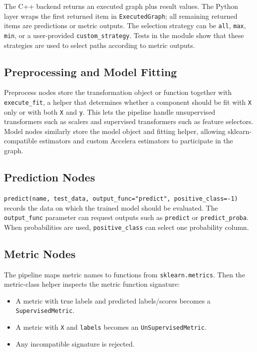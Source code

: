 \documentclass[11pt,a4paper]{article}
\begin{document}
The C++ backend returns an executed graph plus result values. The Python layer
wraps the first returned item in \texttt{ExecutedGraph}; all remaining returned
items are predictions or metric outputs. The selection strategy can be
\texttt{all}, \texttt{max}, \texttt{min}, or a user-provided
\texttt{custom\_strategy}. Tests in the module show that these strategies are
used to select paths according to metric outputs.

\subsection{Preprocessing and Model Fitting}

Preprocess nodes store the transformation object or function together with
\texttt{execute\_fit}, a helper that determines whether a component should be
fit with \texttt{X} only or with both \texttt{X} and \texttt{y}. This lets the
pipeline handle unsupervised transformers such as scalers and supervised
transformers such as feature selectors. Model nodes similarly store the model
object and fitting helper, allowing sklearn-compatible estimators and custom
Accelera estimators to participate in the graph.

\subsection{Prediction Nodes}

\texttt{predict(name, test\_data, output\_func="predict", positive\_class=-1)}
records the data on which the trained model should be evaluated. The
\texttt{output\_func} parameter can request outputs such as \texttt{predict} or
\texttt{predict\_proba}. When probabilities are used, \texttt{positive\_class}
can select one probability column.

\subsection{Metric Nodes}

The pipeline maps metric names to functions from \texttt{sklearn.metrics}.
Then the metric-class helper inspects the metric function signature:

\begin{itemize}[leftmargin=*]
  \item A metric with true labels and predicted labels/scores becomes a
        \texttt{SupervisedMetric}.
  \item A metric with \texttt{X} and \texttt{labels} becomes an
        \texttt{UnSupervisedMetric}.
  \item Any incompatible signature is rejected.
\end{itemize}
\end{document}

